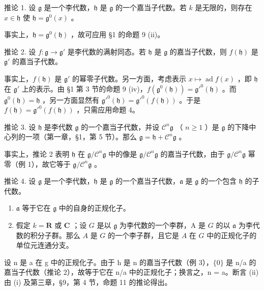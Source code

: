 推论 1. 设 \(\mathfrak{g}\) 是一个李代数，\(\mathfrak{h}\) 是 \(\mathfrak{g}\) 的一个嘉当子代数。若 \(k\) 是无限的，则存在 \(x \in \mathfrak{h}\) 使 \(\mathfrak{h} = \mathfrak{g}^0(x)\) 。

事实上，\(\mathfrak{h} = \mathfrak{g}^0 (\mathfrak{h})\) ，故可应用 §1 的命题 9 (ii)。

推论 2. 设 \(f: \mathfrak{g} \to \mathfrak{g}'\) 是李代数的满射同态。若 \(\mathfrak{h}\) 是 \(\mathfrak{g}\) 的嘉当子代数，则 \(f(\mathfrak{h})\) 是 \(\mathfrak{g}'\) 的嘉当子代数。

事实上，\(f(\mathfrak{h})\) 是 \(\mathfrak{g}'\) 的幂零子代数。另一方面，考虑表示 \(x \mapsto \operatorname{ad} f(x)\) ，即 \(\mathfrak{h}\) 在 \(\mathfrak{g}'\) 上的表示。由 §1 第 3 节的命题 9 (iv)，\(f(\mathfrak{g}^0(\mathfrak{h})) = \mathfrak{g}'^0(\mathfrak{h})\) 。而 \(\mathfrak{g}^0(\mathfrak{h}) = \mathfrak{h}\) ，另一方面显然有 \(\mathfrak{g}'^0(\mathfrak{h}) = \mathfrak{g}'^0(f(\mathfrak{h}))\) 。于是 \(f(\mathfrak{h}) = \mathfrak{g}'^0(f(\mathfrak{h}))\) ，只需应用命题 4。

推论 3. 设 \(\mathfrak{h}\) 是李代数 \(\mathfrak{g}\) 的一个嘉当子代数，并设 \(\mathcal{C}^n\mathfrak{g}\) （ \(n \geq 1\) ）是 \(\mathfrak{g}\) 的下降中心列的一项（第一章，§1，第 5 节）。那么 \(\mathfrak{g} = \mathfrak{h} + \mathcal{C}^n\mathfrak{g}\) 。

事实上，推论 2 表明 \(\mathfrak{h}\) 在 \(\mathfrak{g} / \mathcal{C}^n\mathfrak{g}\) 中的像是 \(\mathfrak{g} / \mathcal{C}^n\mathfrak{g}\) 的嘉当子代数，由于 \(\mathfrak{g} / \mathcal{C}^n\mathfrak{g}\) 幂零（例 1），故它等于 \(\mathfrak{g} / \mathcal{C}^n\mathfrak{g}\) 。

推论 4. 设 \(\mathfrak{g}\) 是一个李代数，\(\mathfrak{h}\) 是 \(\mathfrak{g}\) 的一个嘉当子代数，\(\mathfrak{a}\) 是 \(\mathfrak{g}\) 的一个包含 \(\mathfrak{h}\) 的子代数。

\begin{enumerate}
\def\labelenumi{(\roman{enumi})}
\item
  \(\mathfrak{a}\) 等于它在 \(\mathfrak{g}\) 中的自身的正规化子。
\item
  假定 \(k = \mathbf{R}\) 或 \(\mathbf{C}\) ；设 \(G\) 是以 \(\mathfrak{g}\) 为李代数的一个李群，A 是 \(G\) 的以 \(\mathfrak{a}\) 为李代数的积分子群。那么 \(A\) 是 \(G\) 的一个李子群，且它是 \(A\) 在 \(G\) 中的正规化子的单位元连通分支。
\end{enumerate}

设 n 是 a 在 g 中的正规化子。由于 h 是 n 的嘉当子代数（例 3），\(\{0\}\) 是 n/a 的嘉当子代数（推论 2），故等于它在 n/a 中的正规化子；换言之，n = a。断言 (ii) 由 (i) 及第三章，§9，第 4 节，命题 11 的推论得出。

